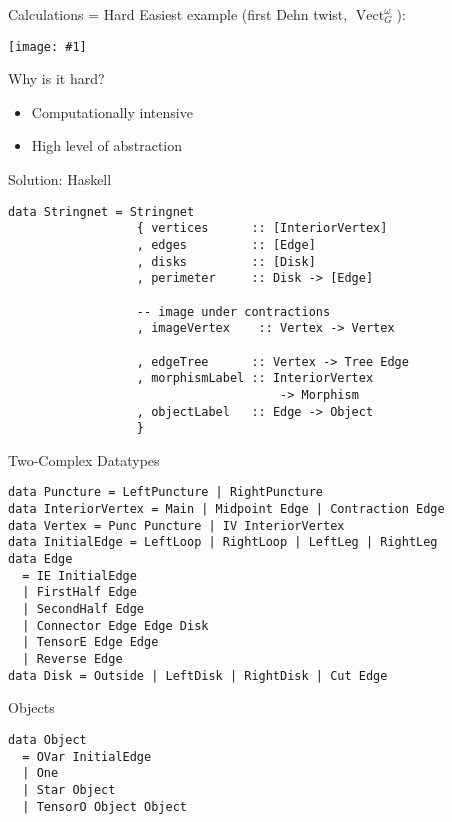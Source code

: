 \documentclass{beamer}
\DeclareMathOperator{\Vect}{Vect}
\newcommand{\img}[1]{
\vfill
\texttt{[image: \#1]}
\vfill
}
\begin{document}
\begin{frame}{Calculations = Hard}
Easiest example (first Dehn twist, $\Vect^\omega_G$):
\img{hard}
\end{frame}

\begin{frame}{Why is it hard?}
\begin{itemize}
\item Computationally intensive  
\item High level of abstraction
\end{itemize}
\end{frame}

\begin{frame}[fragile]{Solution: Haskell}
\begin{verbatim}
data Stringnet = Stringnet
                  { vertices      :: [InteriorVertex]
                  , edges         :: [Edge]
                  , disks         :: [Disk]
                  , perimeter     :: Disk -> [Edge]

                  -- image under contractions
                  , imageVertex    :: Vertex -> Vertex     

                  , edgeTree      :: Vertex -> Tree Edge
                  , morphismLabel :: InteriorVertex 
                                      -> Morphism
                  , objectLabel   :: Edge -> Object
                  }
\end{verbatim}
\end{frame}

\begin{frame}[fragile]{Two-Complex Datatypes}
\begin{verbatim}
data Puncture = LeftPuncture | RightPuncture
data InteriorVertex = Main | Midpoint Edge | Contraction Edge
data Vertex = Punc Puncture | IV InteriorVertex
data InitialEdge = LeftLoop | RightLoop | LeftLeg | RightLeg
data Edge
  = IE InitialEdge
  | FirstHalf Edge
  | SecondHalf Edge
  | Connector Edge Edge Disk
  | TensorE Edge Edge
  | Reverse Edge
data Disk = Outside | LeftDisk | RightDisk | Cut Edge
\end{verbatim}
\end{frame}


\begin{frame}[fragile]{Objects}
\begin{verbatim}
data Object
  = OVar InitialEdge 
  | One 
  | Star Object 
  | TensorO Object Object
\end{verbatim}
\end{frame}
\end{document}
